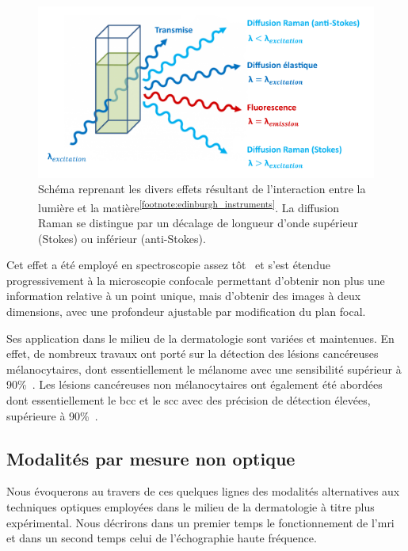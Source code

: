 \begin{figure}[H]
    \centering
    \includegraphics[width=\linewidth]{contents/chapter_2/resources/scheme_principle_raman.pdf}
    \caption{Schéma reprenant les divers effets résultant de l'interaction entre la lumière et la matière\textsuperscript{\ref{footnote:edinburgh_instruments}}. La diffusion Raman se distingue par un décalage de longueur d'onde supérieur (Stokes) ou inférieur (anti-Stokes).}
    \label{fig:scheme_principle_raman}
\end{figure}\par

\addtocounter{footnote}{1}

Cet effet a été employé en spectroscopie assez tôt~\cite{Ferraro2003,Ferraro2003b} et s'est étendue progressivement à la microscopie confocale\cite{Casper2003} permettant d'obtenir non plus une information relative à un point unique, mais d'obtenir des images à deux dimensions, avec une profondeur ajustable par modification du plan focal.\par

Ses application dans le milieu de la dermatologie sont variées et maintenues. En effet, de nombreux travaux ont porté sur la détection des lésions cancéreuses mélanocytaires, dont essentiellement le mélanome avec une sensibilité supérieur à 90\%~\cite{Lui2012,Schleusener2015}. Les lésions cancéreuses non mélanocytaires ont également été abordées dont essentiellement le \gls{bcc} et le \gls{scc} avec des précision de détection élevées, supérieure à 90\%~\cite{Lieber2008,Silveira2015}.\par
\clearpage

\subsection{Modalités par mesure non optique}
Nous évoquerons au travers de ces quelques lignes des modalités alternatives aux techniques optiques employées dans le milieu de la dermatologie à titre plus expérimental. Nous décrirons dans un premier temps le fonctionnement de l'\gls{mri} et dans un second temps celui de l'échographie haute fréquence.\par

